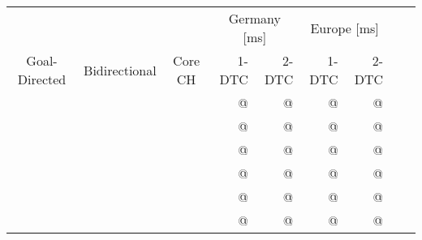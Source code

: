 \begin{tabular}{cccrrrrrr}
	\toprule
	              &               &         & \multicolumn{2}{c}{Germany [\si{\milli\second}]} & \multicolumn{2}{c}{Europe [\si{\milli\second}]}                 \\
	Goal-Directed & Bidirectional & Core CH & 1-DTC                                            & 2-DTC                                           & 1-DTC & 2-DTC \\
	\midrule
	\xmark        & \xmark        & \xmark  & @                                                & @                                               & @     & @     \\
	\xmark        & \cmark        & \xmark  & @                                                & @                                               & @     & @     \\
	\cmark        & \xmark        & \xmark  & @                                                & @                                               & @     & @     \\
	\cmark        & \cmark        & \xmark  & @                                                & @                                               & @     & @     \\
	\xmark        & \cmark        & \cmark  & @                                                & @                                               & @     & @     \\
	\cmark        & \cmark        & \cmark  & @                                                & @                                               & @     & @     \\
	\bottomrule
\end{tabular}